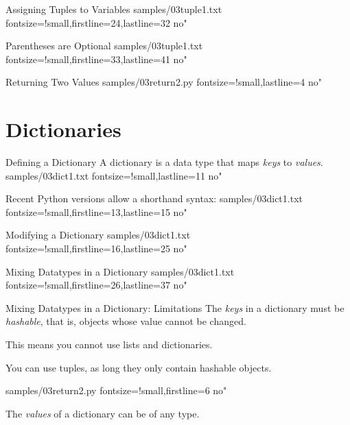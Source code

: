 \documentclass[reference]{pyslides}
\begin{document}
\begin{frame}[fragile]{Assigning Tuples to Variables}
 samples/03tuple1.txt fontsize=!small,firstline=24,lastline=32 no"
\end{frame}

\begin{frame}[fragile]{Parentheses are Optional}
 samples/03tuple1.txt fontsize=!small,firstline=33,lastline=41 no"
\end{frame}

\begin{frame}[fragile]{Returning Two Values}
 samples/03return2.py fontsize=!small,lastline=4 no"
\end{frame}

\section{Dictionaries}

\begin{frame}[fragile]{Defining a Dictionary}
A dictionary is a data type that maps \emph{keys} to \emph{values}.
 samples/03dict1.txt fontsize=!small,lastline=11 no"

\bigskip

Recent Python versions allow a shorthand syntax:
 samples/03dict1.txt fontsize=!small,firstline=13,lastline=15 no"
\end{frame}

\begin{frame}[fragile]{Modifying a Dictionary}
 samples/03dict1.txt fontsize=!small,firstline=16,lastline=25 no"

\end{frame}

\begin{frame}[fragile]{Mixing Datatypes in a Dictionary}
 samples/03dict1.txt fontsize=!small,firstline=26,lastline=37 no"
\end{frame}

\begin{frame}[fragile]{Mixing Datatypes in a Dictionary: Limitations}
The \emph{keys} in a dictionary must be \emph{hashable}, that is, objects whose value cannot be changed.

\bigskip

This means you cannot use lists and dictionaries.

You can use tuples, as long they only contain hashable objects.

 samples/03return2.py fontsize=!small,firstline=6 no"

\bigskip

The \emph{values} of a dictionary can be of any type.

\end{frame}
\end{document}
